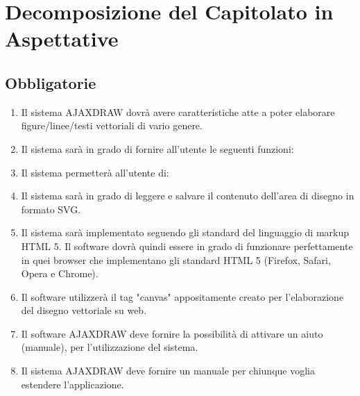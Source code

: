 \newpage

\section{Decomposizione del Capitolato in Aspettative}

\subsection{Obbligatorie}
\begin{enumerate}
\item Il sistema AJAXDRAW dovr\`a avere caratteristiche atte a poter elaborare figure/linee/testi vettoriali di vario genere.
\item Il sistema sar\`a in grado di fornire all'utente le seguenti funzioni:


\item Il sistema permetter\`a all'utente di:


\item Il sistema sar\`a in grado di leggere e salvare il contenuto dell'area di disegno in formato SVG.
\item Il sistema sar\`a implementato seguendo gli standard del linguaggio di markup HTML 5. Il software dovr\`a quindi essere in grado di funzionare perfettamente in quei browser che implementano gli standard HTML 5 (Firefox, Safari, Opera e Chrome). 
\item Il software utilizzer\`a il tag "canvas" appositamente creato per l'elaborazione del disegno vettoriale su web.
\item Il software AJAXDRAW deve fornire la possibilit\`a di attivare un aiuto (manuale), per l'utilizzazione del sistema. 
\item Il sistema AJAXDRAW deve fornire un manuale per chiunque voglia estendere l'applicazione. 
\end{enumerate}

